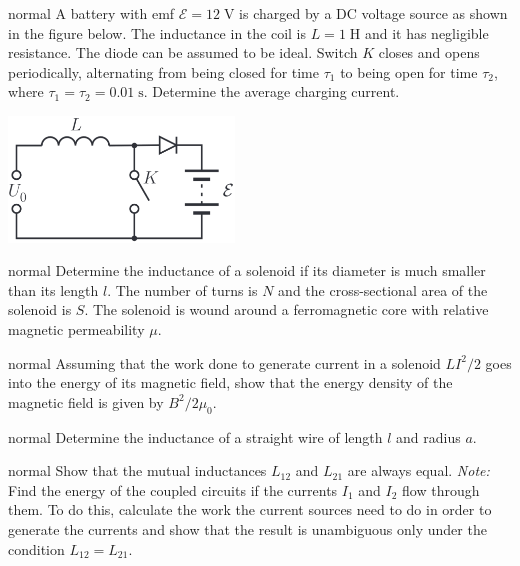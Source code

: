 \hypertarget{P141}{}
\begin{solution}{normal} %
A battery with emf $\mathcal{E}=12\;\text{V}$ is charged by a DC voltage source as shown in the figure below. The inductance in the coil is $L=1\;\text{H}$ and it has negligible resistance. The diode can be assumed to be ideal. Switch $K$ closes and opens periodically, alternating from being closed for time $\tau_1$ to being open for time $\tau_2$, where $\tau_1=\tau_2=0.01\;\text{s}$. Determine the average charging current.
\begin{center}
    \includegraphics[width=0.45\textwidth]{S5 Figures/S5-141.png}
\end{center}
\end{solution}

\hypertarget{P142}{}
\begin{solution}{normal} %
Determine the inductance of a solenoid if its diameter is much smaller than its length $l$. The number of turns is $N$ and the cross-sectional area of the solenoid is $S$. The solenoid is wound around a ferromagnetic core with relative magnetic permeability $\mu$.
\end{solution}

\hypertarget{P143}{}
\begin{solution}{normal} %
Assuming that the work done to generate current in a solenoid $LI^2/2$ goes into the energy of its magnetic field, show that the energy density of the magnetic field is given by $B^2/2\mu_0$.
\end{solution}

\hypertarget{P144}{}
\begin{solution}{normal} %
Determine the inductance of a straight wire of length $l$ and radius $a$.
\end{solution}

\hypertarget{P145}{}
\begin{solution}{normal} %
Show that the mutual inductances $L_{12}$ and $L_{21}$ are always equal. \textit{Note:} Find the energy of the coupled circuits if the currents $I_1$ and $I_2$ flow through them. To do this, calculate the work the current sources need to do in order to generate the currents and show that the result is unambiguous only under the condition $L_{12}=L_{21}$.
\end{solution}

